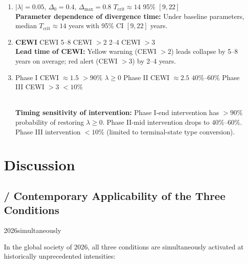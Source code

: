 \documentclass[11pt,a4paper]{article}
\theoremstyle{remark}
\newcommand{\ineq}{\Delta}
\newcommand{\lambdaparam}{\lambda}
\begin{document}
\begin{enumerate}
    \item \textbf{}
          $|\lambdaparam| = 0.05$, $\ineq_0 = 0.4$,
          $\ineq_{\text{max}} = 0.8$ $T_{\text{crit}} \approx 14$ 
          95\%  $[9, 22]$ 
          \\[2pt]
          \textbf{Parameter dependence of divergence time:}
          Under baseline parameters, median $T_{\text{crit}} \approx 14$ years
          with 95\% CI $[9, 22]$ years.

    \item \textbf{CEWI }
          CEWI  5--8 CEWI $>2$
           2--4 CEWI $>3$
          \\[2pt]
          \textbf{Lead time of CEWI:} Yellow warning (CEWI $>2$) leads collapse
          by 5--8 years on average; red alert (CEWI $>3$) by 2--4 years.

    \item \textbf{}
           Phase I CEWI $\approx 1.5$ $>90\%$ 
           $\lambdaparam \geq 0$  Phase II 
          CEWI $\approx 2.5$ $40\%$--$60\%$
           Phase III CEWI $>3$ $<10\%$
          
          \\[2pt]
          \textbf{Timing sensitivity of intervention:}
          Phase I-end intervention has $>90\%$ probability of restoring $\lambdaparam \geq 0$.
          Phase II-mid intervention drops to $40\%$--$60\%$.
          Phase III intervention $<10\%$ (limited to terminal-state type conversion).
\end{enumerate}

\section{}
\section{Discussion}

\subsection{ / Contemporary Applicability of the Three Conditions}

2026simultaneously

In the global society of 2026, all three conditions are simultaneously activated
at historically unprecedented intensities:
\end{document}
